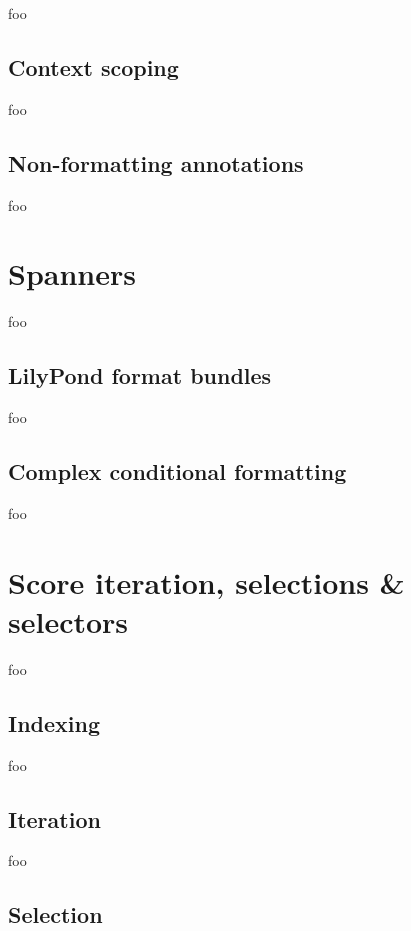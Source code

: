foo

\subsection{Context scoping}

foo

\subsection{Non-formatting annotations}

foo

\section{Spanners}

foo

\subsection{LilyPond format bundles}

foo

\subsection{Complex conditional formatting}

foo

\section{Score iteration, selections \& selectors}

foo

\subsection{Indexing}

foo

\subsection{Iteration}

foo

\subsection{Selection}

